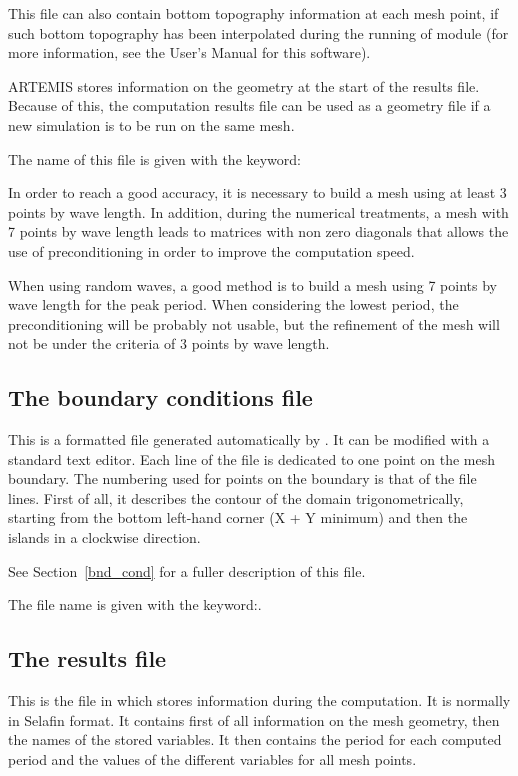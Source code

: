 This file can also contain bottom topography information at each mesh point, if
such bottom topography has been interpolated during the running of module
\stbtel{} (for more information, see the User's Manual for this software).

ARTEMIS stores information on the geometry at the start of the results file.
Because of this, the computation results file can be used as a geometry file if
a new simulation is to be run on the same mesh.

The name of this file is given with the keyword: 

In order to reach a good accuracy, it is necessary to build a mesh using at
least 3 points by wave length. In addition, during the numerical treatments, a
mesh with 7 points by wave length leads to matrices with non zero diagonals
that allows the use of preconditioning in order to improve the computation
speed.

When using random waves, a good method is to build a mesh using 7 points by
wave length for the peak period. When considering the lowest period, the
preconditioning will be probably not usable, but the refinement of the mesh
will not be under the criteria of 3 points by wave length.


\subsection{The boundary conditions file}

This is a formatted file generated automatically by \stbtel{}. It can be
modified with a standard text editor. Each line of the file is dedicated to one
point on the mesh boundary. The numbering used for points on the boundary is
that of the file lines. First of all, it describes the contour of the domain
trigonometrically, starting from the bottom left-hand corner (X + Y minimum)
and then the islands in a clockwise direction.

See Section~\ref{bnd_cond} for a fuller description of this file.

The file name is given with the keyword:.

\subsection{The results file}

This is the file in which \artemis{} stores information during the computation.
It is normally in Selafin format. It contains first of all information on the
mesh geometry, then the names of the stored variables. It then contains the
period for each computed period and the values of the different variables for
all mesh points.

